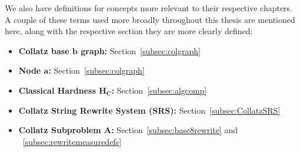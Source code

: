 We also have definitions for concepts more relevant to their respective chapters. A couple of these terms used more broadly throughout this thesis are mentioned here, along with the respective section they are more clearly defined:
\begin{itemize}
\item \textbf{Collatz base $\boldsymbol b$ graph:} Section~\ref{subsec:colgraph}
\item \textbf{Node $\boldsymbol a$:} Section~\ref{subsec:colgraph}
\item \textbf{Classical Hardness $\boldsymbol {H_C}$:} Section~\ref{subsec:algcomp}
\item \textbf{Collatz String Rewrite System (SRS):} Section~\ref{subsec:CollatzSRS}
\item \textbf{Collatz Subproblem $\boldsymbol A$:} Section~\ref{subsec:base8rewrite} and ~\ref{subsec:rewritemeasuredefs} 
\end{itemize}
%
